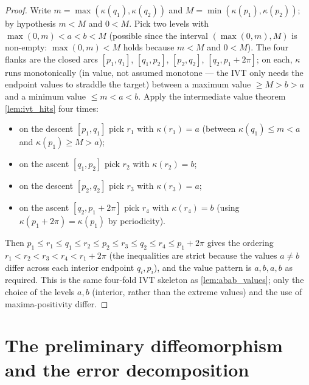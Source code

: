 \begin{proof}
  \leanok
  Write $m=\max(\kappa(q_1),\kappa(q_2))$ and $M=\min(\kappa(p_1),\kappa(p_2))$;
  by hypothesis $m<M$ and $0<M$. Pick two levels with
  $\max(0,m)<a<b<M$ (possible since the interval $(\max(0,m),M)$ is non-empty:
  $\max(0,m)<M$ holds because $m<M$ and $0<M$). The four flanks are the closed
  arcs $[p_1,q_1]$, $[q_1,p_2]$, $[p_2,q_2]$, $[q_2,p_1+2\pi]$; on each, $\kappa$
  runs monotonically (in value, not assumed monotone --- the IVT only needs the
  endpoint values to straddle the target) between a maximum value $\ge M>b>a$ and
  a minimum value $\le m<a<b$. Apply the intermediate value theorem
  \cref{lem:ivt_hits} four times:
  \begin{itemize}
    \item on the descent $[p_1,q_1]$ pick $r_1$ with $\kappa(r_1)=a$
      (between $\kappa(q_1)\le m<a$ and $\kappa(p_1)\ge M>a$);
    \item on the ascent $[q_1,p_2]$ pick $r_2$ with $\kappa(r_2)=b$;
    \item on the descent $[p_2,q_2]$ pick $r_3$ with $\kappa(r_3)=a$;
    \item on the ascent $[q_2,p_1+2\pi]$ pick $r_4$ with $\kappa(r_4)=b$
      (using $\kappa(p_1+2\pi)=\kappa(p_1)$ by periodicity).
  \end{itemize}
  Then $p_1\le r_1\le q_1\le r_2\le p_2\le r_3\le q_2\le r_4\le p_1+2\pi$ gives the
  ordering $r_1<r_2<r_3<r_4<r_1+2\pi$ (the inequalities are strict because the
  values $a\ne b$ differ across each interior endpoint $q_i,p_i$), and the value
  pattern is $a,b,a,b$ as required. This is the same four-fold IVT skeleton as
  \cref{lem:abab_values}; only the choice of the levels $a,b$ (interior, rather
  than the extreme values) and the use of maxima-positivity differ.
\end{proof}

\section{The preliminary diffeomorphism and the error decomposition}

